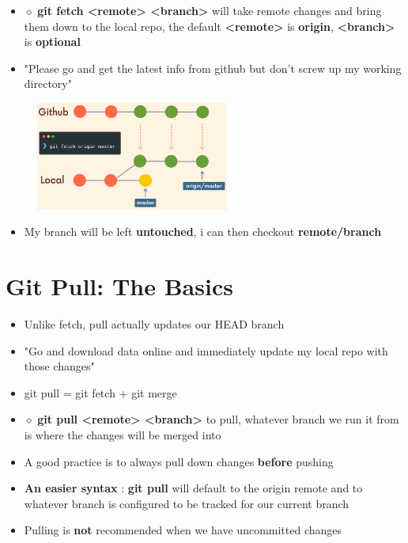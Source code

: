\documentclass{report}
\newcommand{\warning}{
	{\fontencoding{U}\fontfamily{futs}\selectfont\char 66\relax}
}
\begin{document}
\begin{itemize}
	\item $\diamond$ \textbf{git fetch <remote> <branch>} will take remote changes and bring them down to the local repo, the default \textbf{<remote>} is \textbf{origin}, \textbf{<branch>} is \textbf{optional}
	\item "Please go and get the latest info from github but don't screw up my working directory"
\end{itemize}

\begin{figure}[H] 
	 \centering 
	 \includegraphics[width=2.5in]{screenshots/2022-07-08T16-59-32Z.png} 
 \end{figure}

 
\begin{itemize}
	\item My branch will be left \textbf{untouched}, i can then checkout \textbf{remote/branch}
\end{itemize}


\section{Git Pull: The Basics}

\begin{itemize}
	\item Unlike fetch, pull actually updates our HEAD branch 
	\item "Go and download data online and immediately update my local repo with those changes" 
	\item git pull = git fetch + git merge 
	\item $\diamond$ \textbf{git pull <remote> <branch>} to pull, \warning whatever branch we run it from is where the changes will be merged into 
	\item A good practice is to always pull down changes \textbf{before} pushing 
	\item \textbf{An easier syntax} : \textbf{git pull} will default to the origin remote and to whatever branch is configured to be tracked for our current branch 
	\item Pulling is \textbf{not} recommended when we have uncommitted changes
\end{itemize}
\end{document}

